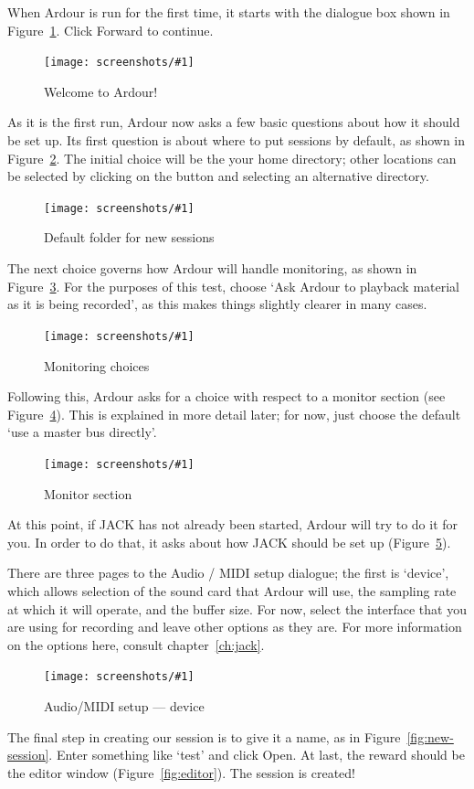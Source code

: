 \documentclass[10pt,a4paper]{book}
\newcommand{\button}[1]{#1}
\newcommand{\screenshot}[3]{%
\begin{figure}[ht]%
\begin{center}
\texttt{[image: screenshots/\#1]}
\end{center}
\caption{#2}
\label{#3}
\end{figure}}
\begin{document}
When Ardour is run for the first time, it starts with the dialogue box
shown in Figure~\ref{fig:welcome-to-ardour}.  Click \button{Forward} to continue.

\screenshot{welcome-to-ardour.png}{Welcome to Ardour!}{fig:welcome-to-ardour}

As it is the first run, Ardour now asks a few basic questions about
how it should be set up.  Its first question is about where to put
sessions by default, as shown in
Figure~\ref{fig:default-folder-for-new-sessions}.  The initial choice
will be the your home directory; other locations can be selected by
clicking on the button and selecting an alternative directory.

\screenshot{default-folder-for-new-sessions.png}{Default folder for new sessions}{fig:default-folder-for-new-sessions}

The next choice governs how Ardour will handle monitoring, as shown in
Figure~\ref{fig:monitoring-choices}.  For the purposes of this test,
choose `Ask Ardour to playback material as it is being recorded', as
this makes things slightly clearer in many cases.

\screenshot{monitoring-choices.png}{Monitoring choices}{fig:monitoring-choices}

Following this, Ardour asks for a choice with respect to a monitor
section (see Figure~\ref{fig:monitor-section}).  This is explained in
more detail later; for now, just choose the default `use a master bus
directly'.

\screenshot{monitor-section.png}{Monitor section}{fig:monitor-section}

At this point, if JACK has not already been started, Ardour will try
to do it for you.  In order to do that, it asks about how JACK should
be set up (Figure~\ref{fig:audio-midi-setup-device}).

There are three pages to the Audio / MIDI setup dialogue; the first is
`device', which allows selection of the sound card that Ardour will
use, the sampling rate at which it will operate, and the buffer size.
For now, select the interface that you are using for recording and
leave other options as they are.  For more information on the options
here, consult chapter~\ref{ch:jack}.

\screenshot{audio-midi-setup-device.png}{Audio/MIDI setup --- device}{fig:audio-midi-setup-device}

The final step in creating our session is to give it a name, as in
Figure~\ref{fig:new-session}.  Enter something like `test' and click
\button{Open}.  At last, the reward should be the editor window
(Figure~\ref{fig:editor}).  The session is created!
\end{document}
